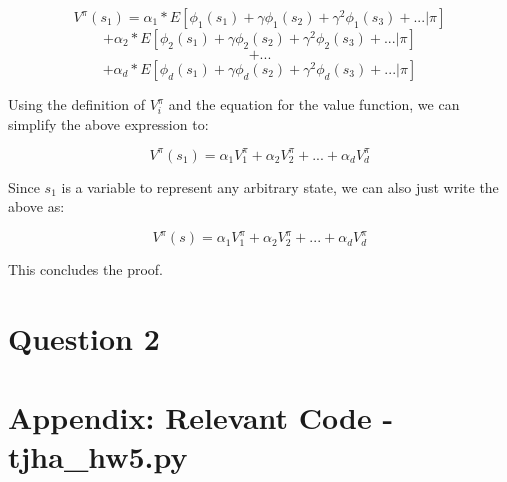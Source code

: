 \documentclass[11pt]{article}
\begin{document}
$$V^{\pi}(s_{1}) = \alpha_{1}* E[\phi_{1}(s_{1}) + \gamma \phi_{1}(s_{2}) + \gamma^{2} \phi_{1}(s_{3}) + ... | \pi] $$
$$
+ \alpha_{2}*E[\phi_{2}(s_{1}) + \gamma \phi_{2}(s_{2}) + \gamma^{2} \phi_{2}(s_{3}) + ... | \pi]$$
$$
+ ... 
$$
$$
+ \alpha_{d}*E[\phi_{d}(s_{1}) + \gamma \phi_{d}(s_{2}) + \gamma^{2} \phi_{d}(s_{3}) + ... | \pi]
$$

Using the definition of $V_{i}^{\pi}$ and the equation for the value function, we can simplify the above expression to:

$$V^{\pi}(s_{1}) = \alpha_{1} V_{1}^{\pi} + \alpha_{2} V_{2}^{\pi} + ... + \alpha_{d} V_{d}^{\pi}
$$

Since $s_{1}$ is a variable to represent any arbitrary state, we can also just write the above as:

$$V^{\pi}(s) = \alpha_{1} V_{1}^{\pi} + \alpha_{2} V_{2}^{\pi} + ... + \alpha_{d} V_{d}^{\pi}
$$

This concludes the proof.

\section*{Question 2}


\section*{Appendix: Relevant Code - tjha\_hw5.py}
   
\end{document}
